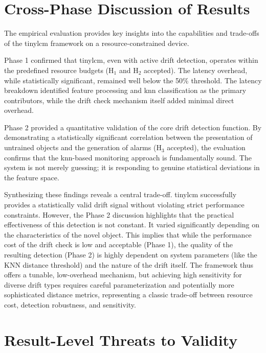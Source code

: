 \section{Cross-Phase Discussion of Results}
\label{sec:cross_phase_discussion_results}

The empirical evaluation provides key insights into the capabilities and trade-offs of the \gls{tinylcm} framework on a resource-constrained device.

Phase 1 confirmed that \gls{tinylcm}, even with active drift detection, operates within the predefined resource budgets (H$_1$ and H$_2$ accepted). The latency overhead, while statistically significant, remained well below the 50\% threshold. The latency breakdown identified feature processing and \gls{knn} classification as the primary contributors, while the drift check mechanism itself added minimal direct overhead.

Phase 2 provided a quantitative validation of the core drift detection function. By demonstrating a statistically significant correlation between the presentation of untrained objects and the generation of alarms (H$_3$ accepted), the evaluation confirms that the \gls{knn}-based monitoring approach is fundamentally sound. The system is not merely guessing; it is responding to genuine statistical deviations in the feature space.

Synthesizing these findings reveals a central trade-off. \gls{tinylcm} successfully provides a statistically valid drift signal without violating strict performance constraints. However, the Phase 2 discussion highlights that the practical effectiveness of this detection is not constant. It varied significantly depending on the characteristics of the novel object. This implies that while the performance cost of the drift check is low and acceptable (Phase 1), the quality of the resulting detection (Phase 2) is highly dependent on system parameters (like the KNN distance threshold) and the nature of the drift itself. The framework thus offers a tunable, low-overhead mechanism, but achieving high sensitivity for diverse drift types requires careful parameterization and potentially more sophisticated distance metrics, representing a classic trade-off between resource cost, detection robustness, and sensitivity.

\section{Result-Level Threats to Validity}
\label{sec:result_level_threats_validity}

